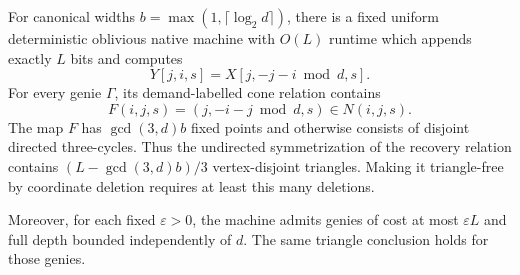 \begin{proposition}\label{prop:nb-triangles}
\notformalized
For canonical widths $b=\max(1,\lceil\log_2d\rceil)$, there is a fixed
uniform deterministic oblivious native machine with $O(L)$ runtime
which appends exactly $L$ bits and computes
\[
 Y[j,i,s]=X[j,-j-i\bmod d,s].
\]
For every genie $\Gamma$, its demand-labelled cone relation contains
\begin{equation}\label{eq:nb-triangle-map}
 F(i,j,s)=(j,-i-j\bmod d,s)\in N(i,j,s).
\end{equation}
The map $F$ has $\gcd(3,d)b$ fixed points and otherwise consists of
disjoint directed three-cycles.  Thus the undirected symmetrization of
the recovery relation contains
$(L-\gcd(3,d)b)/3$ vertex-disjoint triangles.  Making it triangle-free
by coordinate deletion requires at least this many deletions.

Moreover, for each fixed $\varepsilon>0$, the machine admits genies of
cost at most $\varepsilon L$ and full depth bounded independently of
$d$.  The same triangle conclusion holds for those genies.
\end{proposition}

